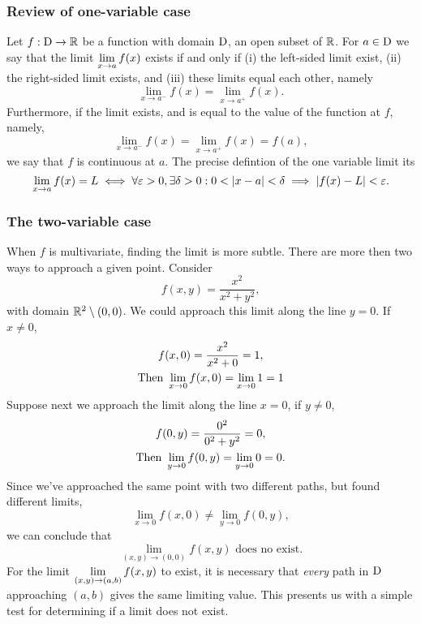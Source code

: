 \documentclass{report}
\begin{document}
\subsubsection*{Review of one-variable case}
Let $f:\mathrm{D}\to\mathbb{R}$ be a function with domain $\mathrm{D}$, an open subset of $\mathbb{R}$. For $a\in\mathrm{D}$ we say that the limit $\displaystyle{\lim_{x\to a}f(x)}$ exists if and only if (i) the left-sided limit exist, (ii) the right-sided limit exists, and (iii) these limits equal each other, namely
$$
	\lim_{x\to a^-} f(x) = \lim_{x\to a^+} f(x).
$$
Furthermore, if the limit exists, and is equal to the value of the function at $f$, namely,
$$
	\lim_{x\to a^-} f(x) = \lim_{x\to a^+} f(x) = f(a),
$$
we say that $f$ is continuous at $a$. The precise defintion of the one variable limit its
$$
	\lim_{x\to a}f(x)=L\iff \forall\varepsilon>0,\exists\delta>0:0<\left| x-a \right|<\delta\implies\left| f(x)-L \right|<\varepsilon.
$$
\subsubsection*{The two-variable case}
When $f$ is multivariate, finding the limit is more subtle. There are more then two ways to approach a given point. Consider 
$$
	f(x,y) = \frac{x^2}{x^2+y^2},
$$
with domain $\mathbb{R}^2\setminus{(0,0)}$.
We could approach this limit along the line $y=0$. If $x\neq0$,
\begin{gather*}
	f(x,0) = \frac{x^2}{x^2 + 0} = 1, \\
	\text{Then } \lim_{x\to0} f(x,0) = \lim_{x\to0} 1 = 1
\end{gather*}
Suppose next we approach the limit along the line $x=0$, if $y\neq0$,
\begin{gather*}
	f(0,y) = \frac{0^2}{0^2 + y^2} = 0, \\
	\text{Then } \lim_{y\to0} f(0,y) = \lim_{y\to0} 0 = 0.
\end{gather*}
Since we've approached the same point with two different paths, but found different limits,
$$
	\lim_{x\to0} f(x,0) \neq \lim_{y\to0} f(0,y),
$$
we can conclude that
$$
	\lim_{(x,y)\to(0,0)}f(x,y) \text{ does no exist.}
$$
For the limit $\displaystyle{\lim_{(x,y)\to(a,b)} f(x,y)}$ to exist, it is necessary that \textit{every} path in $\mathrm{D}$ approaching $(a,b)$ gives the same limiting value. This presents us with a simple test for determining if a limit does not exist.
\end{document}
